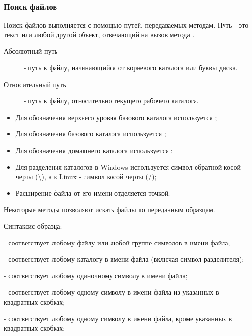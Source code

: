 \subsubsection*{Поиск файлов}

Поиск файлов выполняется с помощью путей, передаваемых методам. Путь - это текст или любой другой объект, отвечающий на вызов метода .

\begin{description}
  \item[Абсолютный путь] - путь к файлу, начинающийся от корневого каталога или буквы диска. 
  \item[Относительный путь] - путь к файлу, относительно текущего рабочего каталога.
\end{description}

\begin{itemize} 
  \item Для обозначения верхнего уровня базового каталога используется ; 
  \item Для обозначения базового каталога используется ; 
  \item Для обозначения домашнего каталога используется \mono{\textasciitilde};
  \item Для разделения каталогов в Windows используется символ обратной косой черты (\textbackslash), а в Linux - символ косой черты (/);
  \item Расширение файла от его имени отделяется точкой.
\end{itemize}

Некоторые методы позволяют искать файлы по переданным образцам.
\begin{keylist}{Синтаксис образца:}
  
  \firstkey{*} - соответствует любому файлу или любой группе символов в имени файла; 
  
  \key{**} - соответствует любому каталогу в имени файла (включая символ разделителя); 
  
   - соответствует любому одиночному символу в имени файла; 
  
  \key{[...]} - соответствует любому одному символу в имени файла из указанных в квадратных скобках; 
  
  \key{[\textasciicircum...]} - соответствует любому одному символу в имени файла, кроме указанных в квадратных скобках; 
  
\end{keylist}

